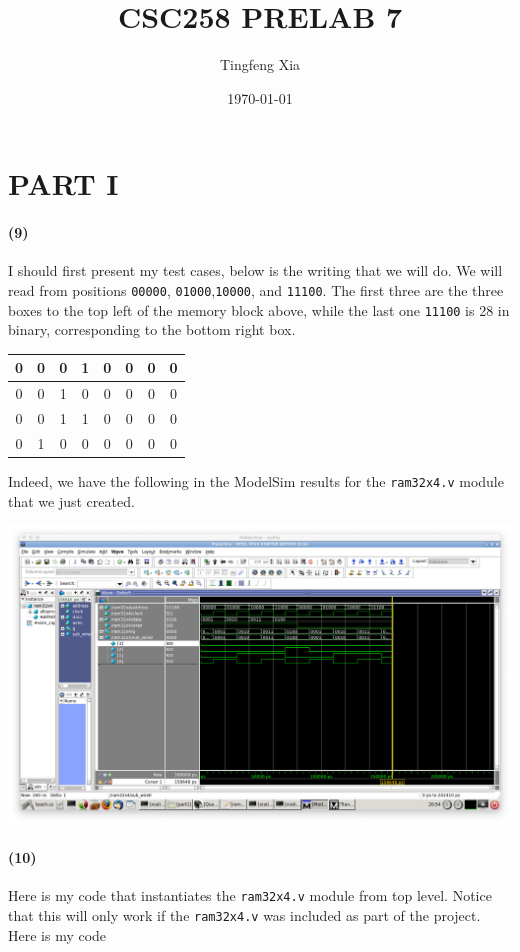 \documentclass{article}
\title{CSC258 PRELAB 7}
\author{Tingfeng Xia}
\date{\today}
\begin{document}
\maketitle
\section*{PART I}
\paragraph{(9)} I should first present my test cases, below is the writing that we will do. We will read from positions \texttt{00000}, \texttt{01000},\texttt{10000}, and \texttt{11100}. The first three are the three boxes to the top left of the memory block above, while the last one \texttt{11100} is 28 in binary, corresponding to the bottom right box.
\begin{center}
    \begin{tabular}{ ||cccc|cccc|| }
        \hline\hline
        0 & 0 & 0 & 1 & 0 & 0 & 0 & 0 \\ \hline
        0 & 0 & 1 & 0 & 0 & 0 & 0 & 0 \\ \hline
        0 & 0 & 1 & 1 & 0 & 0 & 0 & 0 \\ \hline
        0 & 1 & 0 & 0 & 0 & 0 & 0 & 0 \\
        \hline\hline
    \end{tabular}
\end{center}
Indeed, we have the following in the ModelSim results for the \texttt{ram32x4.v} module that we just created.
\begin{center}
    \includegraphics[scale=0.33]{part1_sim_ram32x4.png}
\end{center}

\paragraph{(10)} Here is my code that instantiates the \texttt{ram32x4.v} module from top level. Notice that this will only work if the \texttt{ram32x4.v} was included as part of the project. Here is my code
\end{document}
